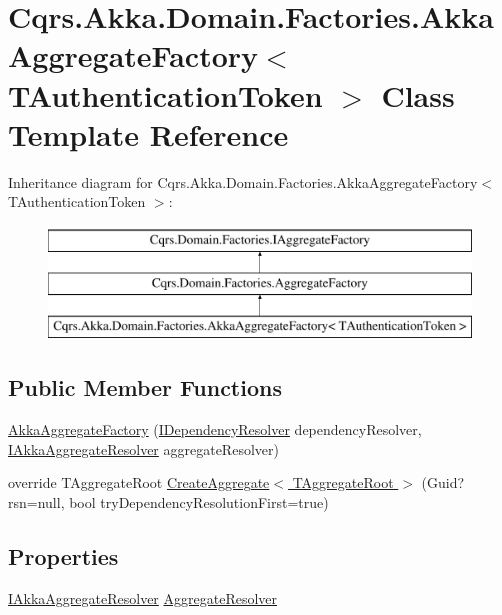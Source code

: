 \hypertarget{classCqrs_1_1Akka_1_1Domain_1_1Factories_1_1AkkaAggregateFactory}{}\section{Cqrs.\+Akka.\+Domain.\+Factories.\+Akka\+Aggregate\+Factory$<$ T\+Authentication\+Token $>$ Class Template Reference}
\label{classCqrs_1_1Akka_1_1Domain_1_1Factories_1_1AkkaAggregateFactory}
Inheritance diagram for Cqrs.\+Akka.\+Domain.\+Factories.\+Akka\+Aggregate\+Factory$<$ T\+Authentication\+Token $>$\+:\begin{figure}[H]
\begin{center}
\leavevmode
\includegraphics[height=3.000000cm]{classCqrs_1_1Akka_1_1Domain_1_1Factories_1_1AkkaAggregateFactory}
\end{center}
\end{figure}
\subsection*{Public Member Functions}
\begin{DoxyCompactItemize}
\item 
\hyperlink{classCqrs_1_1Akka_1_1Domain_1_1Factories_1_1AkkaAggregateFactory_a589acbd624020f419480f28c16e1c03b_a589acbd624020f419480f28c16e1c03b}{Akka\+Aggregate\+Factory} (\hyperlink{interfaceCqrs_1_1Configuration_1_1IDependencyResolver}{I\+Dependency\+Resolver} dependency\+Resolver, \hyperlink{interfaceCqrs_1_1Akka_1_1Domain_1_1IAkkaAggregateResolver}{I\+Akka\+Aggregate\+Resolver} aggregate\+Resolver)
\item 
override T\+Aggregate\+Root \hyperlink{classCqrs_1_1Akka_1_1Domain_1_1Factories_1_1AkkaAggregateFactory_a41fbe3e0d84a4f9244fcd13058337412_a41fbe3e0d84a4f9244fcd13058337412}{Create\+Aggregate$<$ T\+Aggregate\+Root $>$} (Guid? rsn=null, bool try\+Dependency\+Resolution\+First=true)
\end{DoxyCompactItemize}
\subsection*{Properties}
\begin{DoxyCompactItemize}
\item 
\hyperlink{interfaceCqrs_1_1Akka_1_1Domain_1_1IAkkaAggregateResolver}{I\+Akka\+Aggregate\+Resolver} \hyperlink{classCqrs_1_1Akka_1_1Domain_1_1Factories_1_1AkkaAggregateFactory_ae83aa4aa5cbe5fe0cc0cea41de002218_ae83aa4aa5cbe5fe0cc0cea41de002218}{Aggregate\+Resolver}
\end{DoxyCompactItemize}


